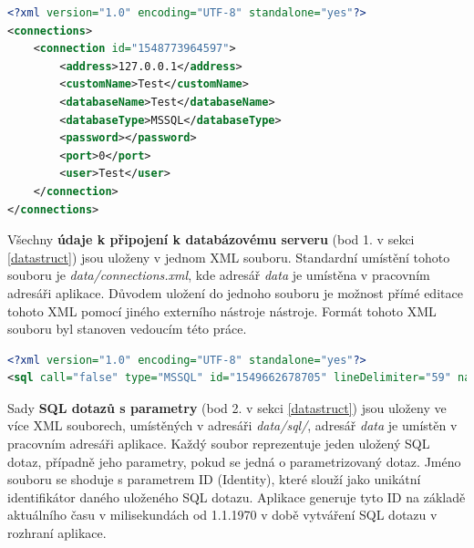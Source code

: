 \documentclass[czech,bachelor,public,dept460,male,cpdeclaration,twoside]{diploma}
\begin{document}
\begin{minipage}{\linewidth}
\begin{lstlisting}[caption=Údaje k připojení k databázovému serveru ve formátu XML\label{lst:con},language=XML] 
<?xml version="1.0" encoding="UTF-8" standalone="yes"?>
<connections>
    <connection id="1548773964597">
        <address>127.0.0.1</address>
        <customName>Test</customName>
        <databaseName>Test</databaseName>
        <databaseType>MSSQL</databaseType>
        <password></password>
        <port>0</port>
        <user>Test</user>
    </connection>
</connections>
\end{lstlisting}
Všechny \textbf{údaje k připojení k databázovému serveru} (bod 1. v sekci \ref{datastruct}) jsou uloženy v jednom XML souboru. Standardní umístění tohoto souboru je \textit{data/connections.xml}, kde adresář \textit{data} je umístěna v pracovním adresáři aplikace. Důvodem uložení do jednoho souboru je možnost přímé editace tohoto XML pomocí jiného externího nástroje nástroje. Formát tohoto XML souboru byl stanoven vedoucím této práce.
\end{minipage}

\lstset{aboveskip=30pt}

\begin{minipage}{\linewidth}
\begin{lstlisting}[caption=SQL dotazy s parametry ve formátu XML\label{lst:set},language=XML] 
<?xml version="1.0" encoding="UTF-8" standalone="yes"?>
<sql call="false" type="MSSQL" id="1549662678705" lineDelimiter="59" name="MujSelect" paramDelimiter="44" parametrized="true" query="true" text="select * from test;" timeout="100" update="false"/>
\end{lstlisting}
Sady \textbf{SQL dotazů s parametry} (bod 2. v sekci \ref{datastruct}) jsou uloženy ve více XML souborech, umístěných v adresáři \textit{data/sql/}, adresář \textit{data} je umístěn v pracovním adresáři aplikace. Každý soubor reprezentuje jeden uložený SQL dotaz, případně jeho parametry, pokud se jedná o parametrizovaný dotaz. Jméno souboru se shoduje s parametrem ID (Identity), které slouží jako unikátní identifikátor daného uloženého SQL dotazu. Aplikace generuje tyto ID na základě aktuálního času v milisekundách od 1.1.1970 v době vytváření SQL dotazu v rozhraní aplikace.
\end{minipage}

\lstset{aboveskip=30pt}
\end{document}
